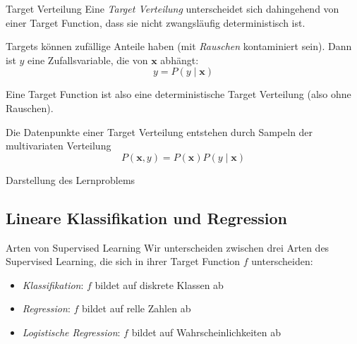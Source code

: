 \begin{defi}{Target Verteilung}
    Eine \emph{Target Verteilung} unterscheidet sich dahingehend von einer Target Function, dass sie nicht zwangsläufig deterministisch ist.

    Targets können zufällige Anteile haben (mit \emph{Rauschen} kontaminiert sein).
    Dann ist $y$ eine Zufallsvariable, die von $\mathbf{x}$ abhängt:
    \[
        y = P(y \mid \mathbf{x})
    \]

    Eine Target Function ist also eine deterministische Target Verteilung (also ohne Rauschen).

    Die Datenpunkte einer Target Verteilung entstehen durch Sampeln der multivariaten Verteilung
    \[
        P(\mathbf{x}, y) = P(\mathbf{x}) P(y \mid \mathbf{x})
    \]
\end{defi}

\begin{bonus}{Darstellung des Lernproblems}

\end{bonus}

\subsection{Lineare Klassifikation und Regression}

\begin{defi}{Arten von Supervised Learning}
    Wir unterscheiden zwischen drei Arten des Supervised Learning, die sich in ihrer Target Function $f$ unterscheiden:
    \begin{itemize}
        \item \emph{Klassifikation}: $f$ bildet auf diskrete Klassen ab
        \item \emph{Regression}: $f$ bildet auf relle Zahlen ab
        \item \emph{Logistische Regression}: $f$ bildet auf Wahrscheinlichkeiten ab
    \end{itemize}
\end{defi}

